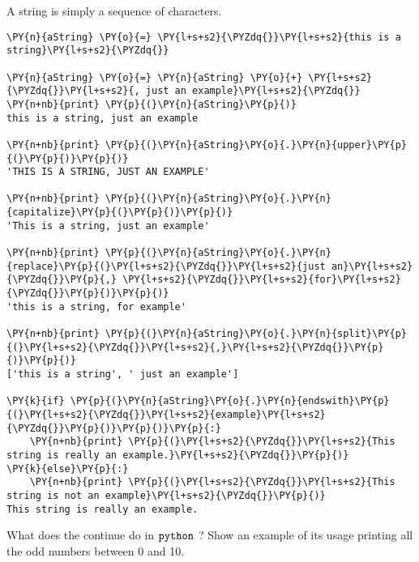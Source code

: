 \begin{Answer}
A string is simply a sequence of characters.

\begin{tcolorbox}[size=fbox, boxrule=1pt, colback=cellbackground, colframe=cellborder]
\begin{Verbatim}[commandchars=\\\{\}]
\PY{n}{aString} \PY{o}{=} \PY{l+s+s2}{\PYZdq{}}\PY{l+s+s2}{this is a string}\PY{l+s+s2}{\PYZdq{}}
  
\PY{n}{aString} \PY{o}{=} \PY{n}{aString} \PY{o}{+} \PY{l+s+s2}{\PYZdq{}}\PY{l+s+s2}{, just an example}\PY{l+s+s2}{\PYZdq{}}
\PY{n+nb}{print} \PY{p}{(}\PY{n}{aString}\PY{p}{)}
this is a string, just an example

\PY{n+nb}{print} \PY{p}{(}\PY{n}{aString}\PY{o}{.}\PY{n}{upper}\PY{p}{(}\PY{p}{)}\PY{p}{)}
'THIS IS A STRING, JUST AN EXAMPLE'

\PY{n+nb}{print} \PY{p}{(}\PY{n}{aString}\PY{o}{.}\PY{n}{capitalize}\PY{p}{(}\PY{p}{)}\PY{p}{)}
'This is a string, just an example'

\PY{n+nb}{print} \PY{p}{(}\PY{n}{aString}\PY{o}{.}\PY{n}{replace}\PY{p}{(}\PY{l+s+s2}{\PYZdq{}}\PY{l+s+s2}{just an}\PY{l+s+s2}{\PYZdq{}}\PY{p}{,} \PY{l+s+s2}{\PYZdq{}}\PY{l+s+s2}{for}\PY{l+s+s2}{\PYZdq{}}\PY{p}{)}\PY{p}{)}
'this is a string, for example'

\PY{n+nb}{print} \PY{p}{(}\PY{n}{aString}\PY{o}{.}\PY{n}{split}\PY{p}{(}\PY{l+s+s2}{\PYZdq{}}\PY{l+s+s2}{,}\PY{l+s+s2}{\PYZdq{}}\PY{p}{)}\PY{p}{)}
['this is a string', ' just an example']

\PY{k}{if} \PY{p}{(}\PY{n}{aString}\PY{o}{.}\PY{n}{endswith}\PY{p}{(}\PY{l+s+s2}{\PYZdq{}}\PY{l+s+s2}{example}\PY{l+s+s2}{\PYZdq{}}\PY{p}{)}\PY{p}{)}\PY{p}{:}
    \PY{n+nb}{print} \PY{p}{(}\PY{l+s+s2}{\PYZdq{}}\PY{l+s+s2}{This string is really an example.}\PY{l+s+s2}{\PYZdq{}}\PY{p}{)}
\PY{k}{else}\PY{p}{:}
    \PY{n+nb}{print} \PY{p}{(}\PY{l+s+s2}{\PYZdq{}}\PY{l+s+s2}{This string is not an example}\PY{l+s+s2}{\PYZdq{}}\PY{p}{)}
This string is really an example.
\end{Verbatim}
\end{tcolorbox}
\end{Answer}

\begin{Exercise}
What does the continue do in \(\tt{python}\) ? Show an example of its usage printing all the odd numbers between 0 and 10.
\end{Exercise}

